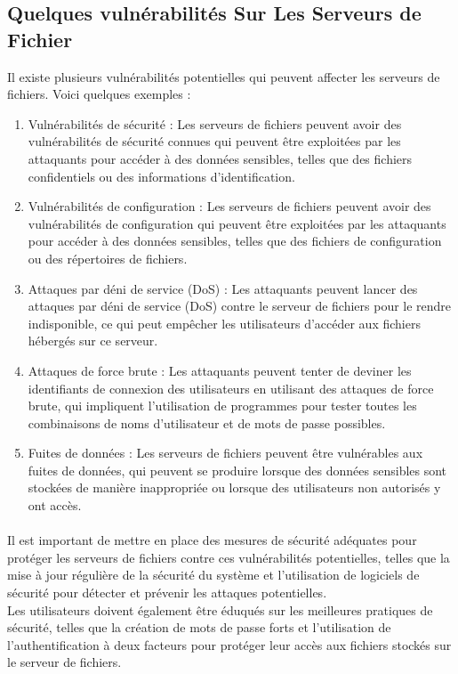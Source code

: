 \subsection{Quelques vulnérabilités Sur Les Serveurs de Fichier}
Il existe plusieurs vulnérabilités potentielles qui peuvent affecter les serveurs de fichiers. Voici quelques exemples :

\begin{enumerate}
\item   Vulnérabilités de sécurité : Les serveurs de fichiers peuvent avoir des vulnérabilités de sécurité connues qui peuvent être exploitées par les attaquants pour accéder à des données sensibles, telles que des fichiers confidentiels ou des informations d'identification.
 
 \item   Vulnérabilités de configuration : Les serveurs de fichiers peuvent avoir des vulnérabilités de configuration qui peuvent être exploitées par les attaquants pour accéder à des données sensibles, telles que des fichiers de configuration ou des répertoires de fichiers.
 
 \item   Attaques par déni de service (DoS) : Les attaquants peuvent lancer des attaques par déni de service (DoS) contre le serveur de fichiers pour le rendre indisponible, ce qui peut empêcher les utilisateurs d'accéder aux fichiers hébergés sur ce serveur.
 
  \item  Attaques de force brute : Les attaquants peuvent tenter de deviner les identifiants de connexion des utilisateurs en utilisant des attaques de force brute, qui impliquent l'utilisation de programmes pour tester toutes les combinaisons de noms d'utilisateur et de mots de passe possibles.
 
 \item   Fuites de données : Les serveurs de fichiers peuvent être vulnérables aux fuites de données, qui peuvent se produire lorsque des données sensibles sont stockées de manière inappropriée ou lorsque des utilisateurs non autorisés y ont accès.
\end{enumerate}

 
\paragraph{ }
 
Il est important de mettre en place des mesures de sécurité adéquates pour protéger les serveurs de fichiers contre ces vulnérabilités potentielles, telles que la mise à jour régulière de la sécurité du système et l'utilisation de logiciels de sécurité pour détecter et prévenir les attaques potentielles.\\
 Les utilisateurs doivent également être éduqués sur les meilleures pratiques de sécurité, telles que la création de mots de passe forts et l'utilisation de l'authentification à deux facteurs pour protéger leur accès aux fichiers stockés sur le serveur de fichiers.
